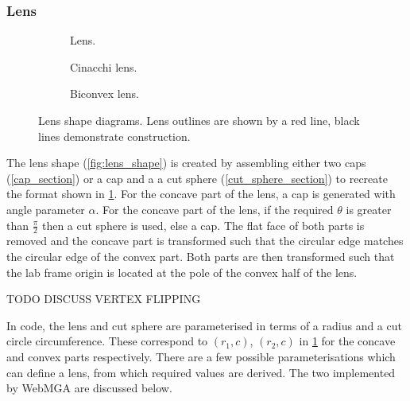 \subsubsection{Lens}
\begin{figure}
  \begin{center}
    \begin{subfigure}{0.3\textwidth}
      
      \caption{Lens.}
      \label{fig:lens_diagram}
    \end{subfigure}
    \begin{subfigure}{0.3\textwidth}
      
      \caption{Cinacchi lens.}
      \label{fig:cinacchi_lens_diagram}
    \end{subfigure}
    \begin{subfigure}{0.3\textwidth}
      
      \caption{Biconvex lens.}
      \label{fig:biconvex_lens_diagram}
    \end{subfigure}
  \end{center}
  \caption{Lens shape diagrams. Lens outlines are shown by a red line, black lines demonstrate construction.}
  \label{fig:lens_descriptions}
\end{figure}

The lens shape (\cref{fig:lens_shape}) is created by assembling either two caps (\cref{cap_section}) or a cap and a a cut sphere (\cref{cut_sphere_section}) to recreate the format shown in \cref{fig:lens_diagram}. For the concave part of the lens, a cap is generated with angle parameter $\alpha$. For the concave part of the lens, if the required $\theta$ is greater than $\frac{\pi}{2}$ then a cut sphere is used, else a cap. The flat face of both parts is removed and the concave part is transformed such that the circular edge matches the circular edge of the convex part. Both parts are then transformed such that the lab frame origin is located at the pole of the convex half of the lens.

TODO DISCUSS VERTEX FLIPPING

In code, the lens and cut sphere are parameterised in terms of a radius and a cut circle circumference. These correspond to $(r_1,c)$, $(r_2,c)$ in \cref{fig:lens_diagram} for the concave and convex parts respectively. There are a few possible parameterisations which can define a lens, from which required values are derived. The two implemented by WebMGA are discussed below.
